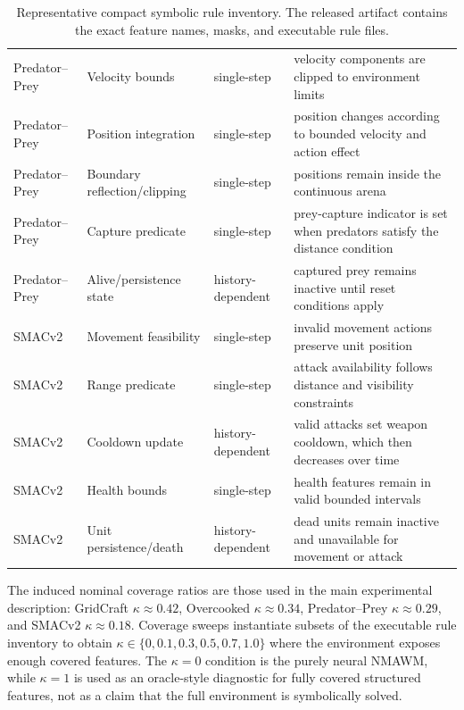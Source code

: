 \documentclass{article}
\theoremstyle{plain}
\theoremstyle{definition}
\theoremstyle{remark}
\begin{document}
\begin{table}[h!]
{\begin{tabular}{llll}
      \midrule
      Predator--Prey       & Velocity bounds              & single-step       & velocity components are clipped to environment limits                                        \\
      Predator--Prey       & Position integration         & single-step       & position changes according to bounded velocity and action effect                             \\
      Predator--Prey       & Boundary reflection/clipping & single-step       & positions remain inside the continuous arena                                                 \\
      Predator--Prey       & Capture predicate            & single-step       & prey-capture indicator is set when predators satisfy the distance condition                  \\
      Predator--Prey       & Alive/persistence state      & history-dependent & captured prey remains inactive until reset conditions apply                                  \\
      \midrule
      SMACv2               & Movement feasibility         & single-step       & invalid movement actions preserve unit position                                              \\
      SMACv2               & Range predicate              & single-step       & attack availability follows distance and visibility constraints                              \\
      SMACv2               & Cooldown update              & history-dependent & valid attacks set weapon cooldown, which then decreases over time                            \\
      SMACv2               & Health bounds                & single-step       & health features remain in valid bounded intervals                                            \\
      SMACv2               & Unit persistence/death       & history-dependent & dead units remain inactive and unavailable for movement or attack                            \\
      \bottomrule
    \end{tabular}
  }
  \caption{Representative compact symbolic rule inventory. The released artifact contains the exact feature names, masks, and executable rule files.}
  \label{tab:symbolic_rule_inventory}
\end{table}

The induced nominal coverage ratios are those used in the main experimental description: GridCraft $\kappa\approx0.42$, Overcooked $\kappa\approx0.34$, Predator--Prey $\kappa\approx0.29$, and SMACv2 $\kappa\approx0.18$. Coverage sweeps instantiate subsets of the executable rule inventory to obtain $\kappa\in\{0,0.1,0.3,0.5,0.7,1.0\}$ where the environment exposes enough covered features. The $\kappa=0$ condition is the purely neural NMAWM, while $\kappa=1$ is used as an oracle-style diagnostic for fully covered structured features, not as a claim that the full environment is symbolically solved.
\end{document}
